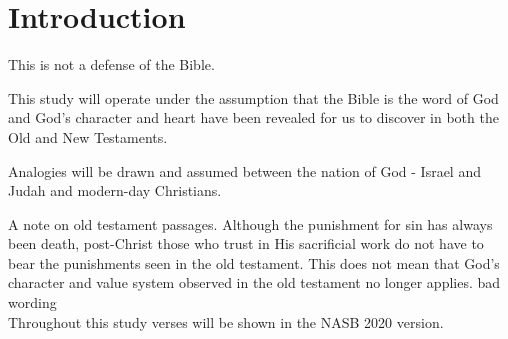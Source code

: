 \chapter{Introduction}

This is not a defense of the Bible. 

This study will operate under the assumption that the Bible is the word of God and God's character and heart have been revealed for us to discover in both the Old and New Testaments.



Analogies will be drawn and assumed between the nation of God - Israel and Judah and modern-day Christians.


A note on old testament passages. Although the punishment for sin has always been death, post-Christ those who trust in His sacrificial work do not have to bear the punishments seen in the old testament. This does not mean that God's character and value system observed in the old testament no longer applies. bad wording\\

Throughout this study verses will be shown in the NASB 2020 version.